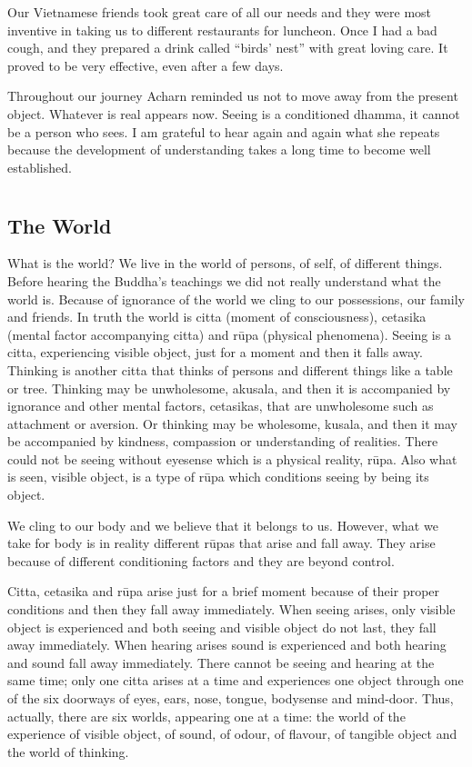 Our Vietnamese friends took great care of all our needs and they were
most inventive in taking us to different restaurants for luncheon. Once
I had a bad cough, and they prepared a drink called ``birds' nest'' with
great loving care. It proved to be very effective, even after a few
days.

Throughout our journey Acharn reminded us not to move away from the
present object. Whatever is real appears now. Seeing is a conditioned
dhamma, it cannot be a person who sees. I am grateful to hear again and
again what she repeats because the development of understanding takes a
long time to become well established.

\chapter[The World]{}
\section*{The World}


What is the world? We live in the world of persons, of self, of
different things. Before hearing the Buddha's teachings we did not
really understand what the world is. Because of ignorance of the world
we cling to our possessions, our family and friends. In truth the world
is citta (moment of consciousness), cetasika (mental factor accompanying
citta) and rūpa (physical phenomena). Seeing is a citta, experiencing
visible object, just for a moment and then it falls away. Thinking is
another citta that thinks of persons and different things like a table
or tree. Thinking may be unwholesome, akusala, and then it is
accompanied by ignorance and other mental factors, cetasikas, that are
unwholesome such as attachment or aversion. Or thinking may be
wholesome, kusala, and then it may be accompanied by kindness,
compassion or understanding of realities. There could not be seeing
without eyesense which is a physical reality, rūpa. Also what is seen,
visible object, is a type of rūpa which conditions seeing by being its
object.

We cling to our body and we believe that it belongs to us. However, what
we take for body is in reality different rūpas that arise and fall away.
They arise because of different conditioning factors and they are beyond
control.

Citta, cetasika and rūpa arise just for a brief moment because of their
proper conditions and then they fall away immediately. When seeing
arises, only visible object is experienced and both seeing and visible
object do not last, they fall away immediately. When hearing arises
sound is experienced and both hearing and sound fall away immediately.
There cannot be seeing and hearing at the same time; only one citta
arises at a time and experiences one object through one of the six
doorways of eyes, ears, nose, tongue, bodysense and mind-door. Thus,
actually, there are six worlds, appearing one at a time: the world of
the experience of visible object, of sound, of odour, of flavour, of
tangible object and the world of thinking.

